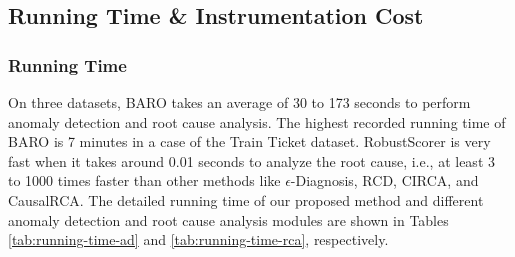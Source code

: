 \subsection{Running Time \& Instrumentation Cost}



\subsubsection{Running Time}

On three datasets, BARO takes an average of 30 to 173 seconds to perform anomaly detection and root cause analysis. The highest recorded running time of BARO is 7 minutes in a case of the Train Ticket dataset. RobustScorer is very fast when it takes around 0.01 seconds to analyze the root cause, i.e., at least 3 to 1000 times faster than other methods like $\epsilon$-Diagnosis, RCD, CIRCA, and CausalRCA. The detailed running time of our proposed method and different anomaly detection and root cause analysis modules are shown in Tables \ref{tab:running-time-ad} and \ref{tab:running-time-rca}, respectively.


